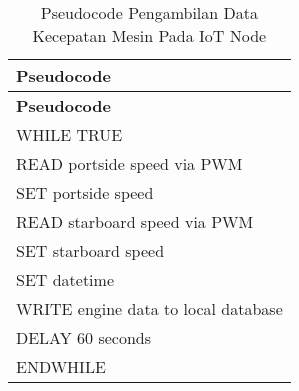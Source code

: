 \begin{longtable}[!h]
  {
          p{}
  }
  \caption{Pseudocode Pengambilan Data Kecepatan Mesin Pada IoT Node}
  \label{tab:pseudocode-iot-node} \\

  \hline
      \bfseries Pseudocode \\ [0.5ex]
  \hline

  \endfirsthead

  \hline
      \bfseries Pseudocode \\ [0.5ex]
  \hline
  \endhead %

  WHILE TRUE \\
  \hspace{5mm} READ portside speed via PWM \\
  \hspace{5mm} SET portside speed \\
  \hspace{5mm} READ starboard speed via PWM \\
  \hspace{5mm} SET starboard speed \\
  \hspace{5mm} SET datetime \\
  \hspace{5mm} WRITE engine data to local database \\
  \hspace{5mm} DELAY 60 seconds \\
  ENDWHILE \\

  \bottomrule
\end{longtable}